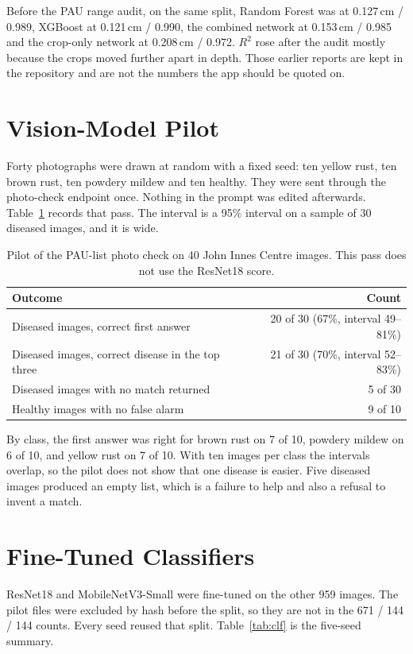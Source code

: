 Before the PAU range audit, on the same split, Random Forest was at 0.127\,cm / 0.989, XGBoost at 0.121\,cm / 0.990, the combined network at 0.153\,cm / 0.985 and the crop-only network at 0.208\,cm / 0.972. $R^{2}$ rose after the audit mostly because the crops moved further apart in depth. Those earlier reports are kept in the repository and are not the numbers the app should be quoted on.

\section{Vision-Model Pilot}
Forty photographs were drawn at random with a fixed seed: ten yellow rust, ten brown rust, ten powdery mildew and ten healthy. They were sent through the photo-check endpoint once. Nothing in the prompt was edited afterwards. Table~\ref{tab:pilot} records that pass. The interval is a 95\% interval on a sample of 30 diseased images, and it is wide.

\begin{table}[H]
\centering
\caption{Pilot of the PAU-list photo check on 40 John Innes Centre images. This pass does not use the ResNet18 score.}
\label{tab:pilot}
\begin{tabular}{lr}
\toprule
\textbf{Outcome} & \textbf{Count} \\
\midrule
Diseased images, correct first answer & 20 of 30 (67\%, interval 49--81\%) \\
Diseased images, correct disease in the top three & 21 of 30 (70\%, interval 52--83\%) \\
Diseased images with no match returned & 5 of 30 \\
Healthy images with no false alarm & 9 of 10 \\
\bottomrule
\end{tabular}
\end{table}

By class, the first answer was right for brown rust on 7 of 10, powdery mildew on 6 of 10, and yellow rust on 7 of 10. With ten images per class the intervals overlap, so the pilot does not show that one disease is easier. Five diseased images produced an empty list, which is a failure to help and also a refusal to invent a match.

\section{Fine-Tuned Classifiers}
ResNet18 and MobileNetV3-Small were fine-tuned on the other 959 images. The pilot files were excluded by hash before the split, so they are not in the 671 / 144 / 144 counts. Every seed reused that split. Table~\ref{tab:clf} is the five-seed summary.


